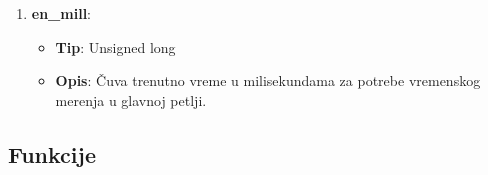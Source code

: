 \documentclass[a4paper, 12pt]{article}
\begin{document}
\begin{enumerate}
    \item \textbf{en\_mill}:
        \begin{itemize}
            \item \textbf{Tip}: Unsigned long
            \item \textbf{Opis}: Čuva trenutno vreme u milisekundama za potrebe vremenskog merenja u glavnoj petlji.
        \end{itemize}
\end{enumerate}

\newpage

	\subsection{Funkcije}

\vspace{10pt}
\end{document}
